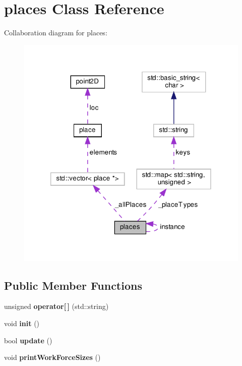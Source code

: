 \hypertarget{classplaces}{}\section{places Class Reference}
\label{classplaces}


Collaboration diagram for places\+:
\nopagebreak
\begin{figure}[H]
\begin{center}
\leavevmode
\includegraphics[width=320pt]{classplaces__coll__graph}
\end{center}
\end{figure}
\subsection*{Public Member Functions}
\begin{DoxyCompactItemize}
\item 
\mbox{\label{classplaces_a18b24350e2ad05ef273df442b6d22593}} 
unsigned {\bfseries operator\mbox{[}$\,$\mbox{]}} (std\+::string)
\item 
\mbox{\label{classplaces_ad126c2796c4fecad43f8e237ffde786d}} 
void {\bfseries init} ()
\item 
\mbox{\label{classplaces_a5ff3d2cd02c18f353ab15dd86f52e7be}} 
bool {\bfseries update} ()
\item 
\mbox{\label{classplaces_acd22734e55333fc53f937251f7f2ba4f}} 
void {\bfseries print\+Work\+Force\+Sizes} ()
\end{DoxyCompactItemize}
